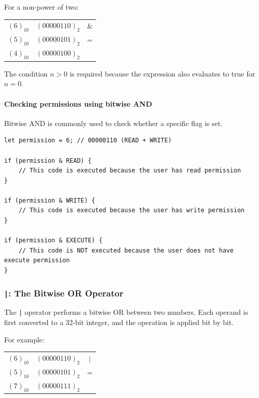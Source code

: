 \documentclass{scrbook}
\begin{document}
For a non-power of two:

\begin{center}
    \begin{tabular}{c c c}
        $(6)_{10}$ & $(00000110)_{2}$ & \& \\
        $(5)_{10}$ & $(00000101)_{2}$ & = \\ \hline
        $(4)_{10}$ & $(00000100)_{2}$ &
    \end{tabular}
\end{center}

The condition $n > 0$ is required because the expression also evaluates to true for $n = 0$.

\paragraph{Checking permissions using bitwise AND}

Bitwise AND is commonly used to check whether a specific flag is set.

\begin{lstlisting}
let permission = 6; // 00000110 (READ + WRITE)

if (permission & READ) {
    // This code is executed because the user has read permission
}

if (permission & WRITE) {
    // This code is executed because the user has write permission
}

if (permission & EXECUTE) {
    // This code is NOT executed because the user does not have execute permission
}
\end{lstlisting}

\subsubsection{\texttt{|}: The Bitwise OR Operator}

The \texttt{|} operator performs a bitwise OR between two numbers. Each operand is first converted to a 32-bit integer, and the operation is applied bit by bit.

For example:

\begin{center}
    \begin{tabular}{c c c}
        $(6)_{10}$ & $(00000110)_{2}$ & $\vert$ \\
        $(5)_{10}$ & $(00000101)_{2}$ & = \\ \hline
        $(7)_{10}$ & $(00000111)_{2}$ &
    \end{tabular}
\end{center}
\end{document}

